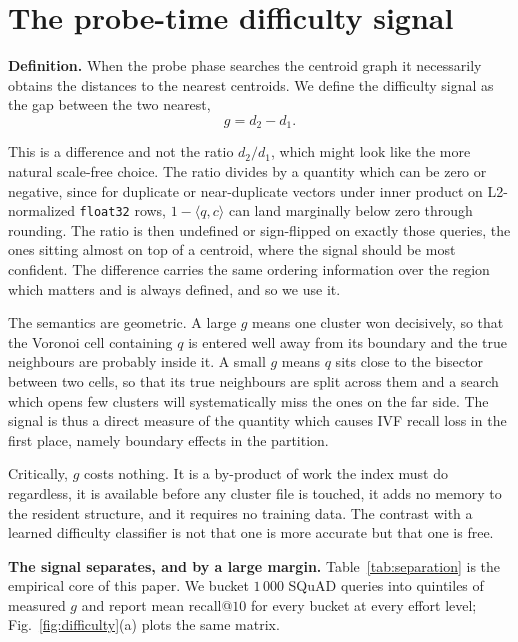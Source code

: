 \documentclass[journal]{IEEEtran}
\begin{document}
\section{The probe-time difficulty signal}
\label{sec:signal}

\textbf{Definition.} When the probe phase searches the centroid graph it
necessarily obtains the distances to the nearest centroids. We define the
difficulty signal as the gap between the two nearest,
\begin{equation}
g = d_2 - d_1 .
\label{eq:gap}
\end{equation}

This is a difference and not the ratio $d_2/d_1$, which might look like the
more natural scale-free choice. The ratio divides by a quantity which can
be zero or negative, since for duplicate or near-duplicate vectors under
inner product on L2-normalized \texttt{float32} rows, $1 - \langle q,
c\rangle$ can land marginally below zero through rounding. The ratio is
then undefined or sign-flipped on exactly those queries, the ones sitting
almost on top of a centroid, where the signal should be most confident. The
difference carries the same ordering information over the region which
matters and is always defined, and so we use it.

The semantics are geometric. A large $g$ means one cluster won decisively,
so that the Voronoi cell containing $q$ is entered well away from its
boundary and the true neighbours are probably inside it. A small $g$ means
$q$ sits close to the bisector between two cells, so that its true
neighbours are split across them and a search which opens few clusters will
systematically miss the ones on the far side. The signal is thus a direct
measure of the quantity which causes IVF recall loss in the first place,
namely boundary effects in the partition.

Critically, $g$ costs nothing. It is a by-product of work the index must do
regardless, it is available before any cluster file is touched, it adds no
memory to the resident structure, and it requires no training data. The
contrast with a learned difficulty classifier is not that one is more
accurate but that one is free.

\textbf{The signal separates, and by a large margin.}
Table~\ref{tab:separation} is the empirical core of this paper. We bucket
$1\,000$ SQuAD queries into quintiles of measured $g$ and report mean
recall@$10$ for every bucket at every effort level; Fig.~\ref{fig:difficulty}(a)
plots the same matrix.
\end{document}
